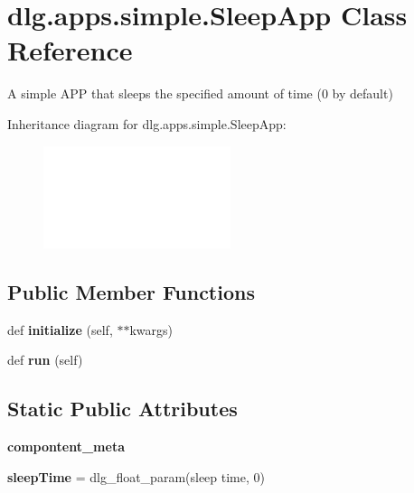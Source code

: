 \hypertarget{classdlg_1_1apps_1_1simple_1_1_sleep_app}{}\section{dlg.\+apps.\+simple.\+Sleep\+App Class Reference}
\label{classdlg_1_1apps_1_1simple_1_1_sleep_app}


A simple A\+PP that sleeps the specified amount of time (0 by default)  


Inheritance diagram for dlg.\+apps.\+simple.\+Sleep\+App\+:\begin{figure}[H]
\begin{center}
\leavevmode
\includegraphics[height=3.000000cm]{classdlg_1_1apps_1_1simple_1_1_sleep_app}
\end{center}
\end{figure}
\subsection*{Public Member Functions}
\begin{DoxyCompactItemize}
\item 
\mbox{\label{classdlg_1_1apps_1_1simple_1_1_sleep_app_a4caa2a071f26e008d51b9e36e566a5bb}} 
def {\bfseries initialize} (self, $\ast$$\ast$kwargs)
\item 
\mbox{\label{classdlg_1_1apps_1_1simple_1_1_sleep_app_a435b7385c062001e2f74a850ec406ecb}} 
def {\bfseries run} (self)
\end{DoxyCompactItemize}
\subsection*{Static Public Attributes}
\begin{DoxyCompactItemize}
\item 
{\bfseries compontent\+\_\+meta}
\item 
\mbox{\label{classdlg_1_1apps_1_1simple_1_1_sleep_app_a410e731dcf165e9c205354b1c4b94b5a}} 
{\bfseries sleep\+Time} = dlg\+\_\+float\+\_\+param(\textquotesingle{}sleep time\textquotesingle{}, 0)
\end{DoxyCompactItemize}


